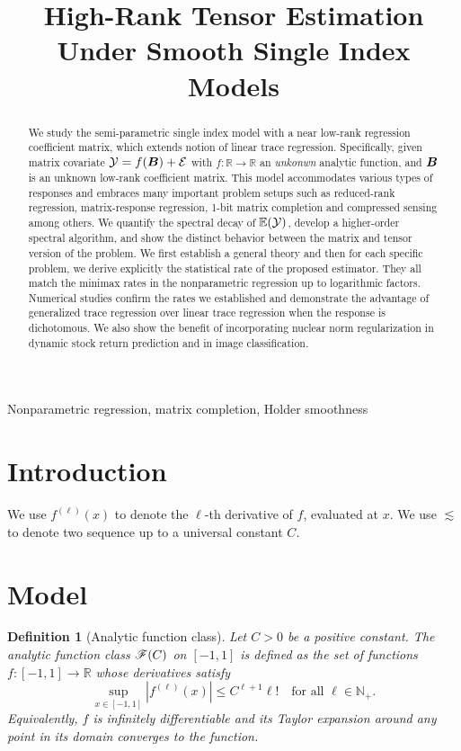 \documentclass[final,12pt]{colt2020} %
\title[Short Title]{High-Rank Tensor Estimation Under Smooth Single Index Models}
\newtheorem{defn}{Definition}
\def\calif{\large\mathscr{F}}
\begin{document}
\maketitle

\begin{abstract}%
We study the semi-parametric single index model with a near low-rank regression coefficient matrix, which extends notion of linear trace regression. Specifically, given matrix covariate $\mathcal{Y}=f(\bm B)+\mathcal{E}$ with $f\colon \mathbb{R}\to\mathbb{R}$ an \emph{unkonwn} analytic function, and $\bm B$ is an unknown low-rank coefficient matrix. This model accommodates various types of responses and embraces many important problem setups such as reduced-rank regression, matrix-response regression, 1-bit matrix completion and compressed sensing among others. We quantify the spectral decay of $\mathbb{E}(\mathcal{Y})$, develop a higher-order spectral algorithm, and show the distinct behavior between the matrix and tensor version of the problem. We first establish a general theory and then for each specific problem, we derive explicitly the statistical rate of the proposed estimator. They all match the minimax rates in the nonparametric regression up to logarithmic factors. Numerical studies confirm the rates we established and demonstrate the advantage of generalized trace regression over linear trace regression when the response is dichotomous. We also show the benefit of incorporating nuclear norm regularization in dynamic stock return prediction and in image classification.
\end{abstract}

\begin{keywords}%
Nonparametric regression, matrix completion, Holder smoothness
\end{keywords}

\section{Introduction}

We use $f^{(\ell)}(x)$ to denote the $\ell$-th derivative of $f$, evaluated at $x$. We use $\lesssim$ to denote two sequence up to a universal constant $C$. 

\section{Model}
\begin{defn}[Analytic function class] Let $C>0$ be a positive constant. The analytic function class $\calif(C)$ on $[-1,1]$ is defined as the set of functions $f\colon [-1,1]\to \mathbb{R}$ whose derivatives satisfy
\[
\sup_{x\in[-1,1]}|f^{(\ell)}(x)|\leq C^{\ell+1}\ell! \quad \text{for all }\ell\in\mathbb{N}_{+}.
\]
Equivalently, $f$ is infinitely differentiable and its Taylor expansion around any point in its domain converges to the function. 
\end{defn}
\end{document}
